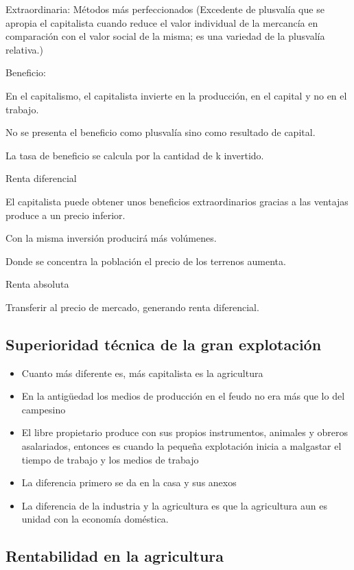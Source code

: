\documentclass[
  a4paper,
]{article}
\begin{document}
Extraordinaria: Métodos más perfeccionados (Excedente de plusvalía que
se apropia el capitalista cuando reduce el valor individual de la
mercancía en comparación con el valor social de la misma; es una
variedad de la plusvalía relativa.)

Beneficio:

En el capitalismo, el capitalista invierte en la producción, en el
capital y no en el trabajo.

No se presenta el beneficio como plusvalía sino como resultado de
capital.

La tasa de beneficio se calcula por la cantidad de k invertido.

Renta diferencial

El capitalista puede obtener unos beneficios extraordinarios gracias a
las ventajas produce a un precio inferior.

Con la misma inversión producirá más volúmenes.

Donde se concentra la población el precio de los terrenos aumenta.

Renta absoluta

Transferir al precio de mercado, generando renta diferencial.

\hypertarget{superioridad-tuxe9cnica-de-la-gran-explotaciuxf3n}{%
\subsection{Superioridad técnica de la gran
explotación}\label{superioridad-tuxe9cnica-de-la-gran-explotaciuxf3n}}

\begin{itemize}
\item
  Cuanto más diferente es, más capitalista es la agricultura
\item
  En la antigüedad los medios de producción en el feudo no era más que
  lo del campesino
\item
  El libre propietario produce con sus propios instrumentos, animales y
  obreros asalariados, entonces es cuando la pequeña explotación inicia
  a malgastar el tiempo de trabajo y los medios de trabajo
\item
  La diferencia primero se da en la casa y sus anexos
\item
  La diferencia de la industria y la agricultura es que la agricultura
  aun es unidad con la economía doméstica.
\end{itemize}

\hypertarget{rentabilidad-en-la-agricultura}{%
\subsection{Rentabilidad en la
agricultura}\label{rentabilidad-en-la-agricultura}}
\end{document}
